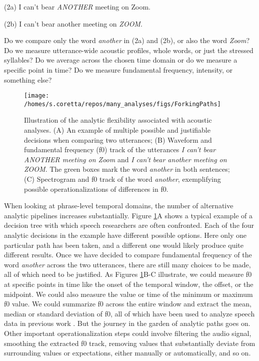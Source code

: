 \documentclass[Review,times,sageh]{sagej}
\begin{document}
\vspace{1em}

(2a) I can't bear \emph{ANOTHER} meeting on Zoom.

(2b) I can't bear another meeting on \emph{ZOOM}.

\vspace{1em}

Do we compare only the word \emph{another} in (2a) and (2b), or also the
word \emph{Zoom}? Do we measure utterance-wide acoustic profiles, whole
words, or just the stressed syllables? Do we average across the chosen
time domain or do we measure a specific point in time? Do we measure
fundamental frequency, intensity, or something else?










\begin{figure}
\texttt{[image: /homes/s.coretta/repos/many\_analyses/figs/ForkingPaths]} \caption{Illustration of the analytic flexibility associated
with acoustic analyses. (A) An example of multiple possible and
justifiable decisions when comparing two utterances; (B) Waveform and
fundamental frequency (f0) track of the utterances \emph{I can't bear
ANOTHER meeting on Zoom} and \emph{I can't bear another meeting on
ZOOM}. The green boxes mark the word \emph{another} in both sentences;
(C) Spectrogram and f0 track of the word \emph{another}, exemplifying
possible operationalizations of differences in f0.}\label{fig:forkingPaths}
\end{figure}

When looking at phrase-level temporal domains, the number of alternative
analytic pipelines increases substantially. Figure
\ref{fig:forkingPaths}A shows a typical example of a decision tree with
which speech researchers are often confronted. Each of the four analytic
decisions in the example have different possible options. Here only one
particular path has been taken, and a different one would likely produce
quite different results. Once we have decided to compare fundamental
frequency of the word \emph{another} across the two utterances, there
are still many choices to be made, all of which need to be justified. As
Figures \ref{fig:forkingPaths}B-C illustrate, we could measure f0 at
specific points in time like the onset of the temporal window, the
offset, or the midpoint. We could also measure the value or time of the
minimum or maximum f0 value. We could summarize f0 across the entire
window and extract the mean, median or standard deviation of f0, all of
which have been used to analyze speech data in previous work
\citep[see][]{gordon2017acoustic}. But the journey in the garden of
analytic paths goes on. Other important operationalization steps could
involve filtering the audio signal, smoothing the extracted f0 track,
removing values that substantially deviate from surrounding values or
expectations, either manually or automatically, and so on.
\end{document}
